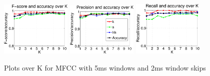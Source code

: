 \begin{figure}


	\centering\includegraphics[width=0.3\textwidth]{mfcc52FP.png}
	\centering\includegraphics[width=0.3\textwidth]{mfcc52_P.png}
	\centering\includegraphics[width=0.3\textwidth]{mfcc52_R.png}
	
	\caption{Plots over K for MFCC with 5ms windows and 2ms window skips}
\end{figure}\clearpage


